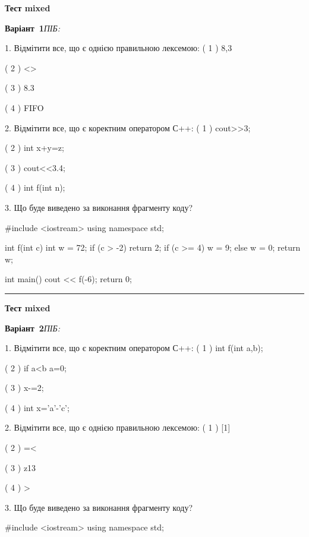 \documentclass[11pt]{article}
\begin{document}
{\large\textbf{Тест mixed}}

\textbf{Варіант \No\,1}\hfill \textit{ПІБ:}\,\underline{\hspace{60mm}}
\vspace{4mm}

1. Відмітити все, що є однією правильною лексемою:
( 1 ) 8,3

( 2 ) <>

( 3 ) 8.3

( 4 ) FIFO

2. Відмітити все, що є коректним оператором С++:
( 1 ) cout>>3;

( 2 ) int x+y=z;

( 3 ) cout<<3.4;

( 4 ) int f(int n);

3. Що буде виведено за виконання фрагменту коду?

#include <iostream>
using namespace std;

int f(int c){
    int w = 72;
    if (c > -2) 
        return 2;
    if (c >= 4)
         w = 9;
    else
         w = 0;
    return w;
}

int main(){
    cout << f(-6);
    return 0;
}





\vspace{10mm}
\noindent\rule{\textwidth}{0.3pt}
\vspace{8mm}
{\large\textbf{Тест mixed}}

\textbf{Варіант \No\,2}\hfill \textit{ПІБ:}\,\underline{\hspace{60mm}}
\vspace{4mm}

1. Відмітити все, що є коректним оператором С++:
( 1 ) int f(int a,b);

( 2 ) if a<b a=0;

( 3 ) x-=2;

( 4 ) int x='a'-'c';

2. Відмітити все, що є однією правильною лексемою:
( 1 ) [1]

( 2 ) =<

( 3 ) z13

( 4 ) >

3. Що буде виведено за виконання фрагменту коду?

#include <iostream>
using namespace std;
\end{document}
